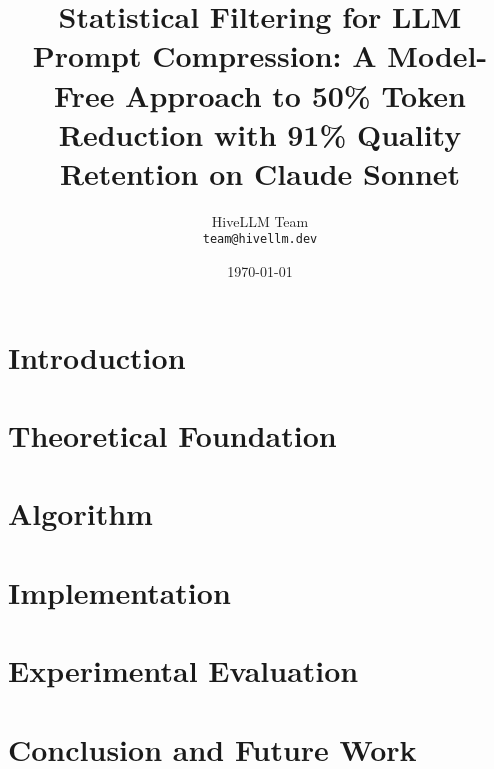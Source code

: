\documentclass{article}
\title{Statistical Filtering for LLM Prompt Compression: A Model-Free Approach to 50\% Token Reduction with 91\% Quality Retention on Claude Sonnet}
\author{
  HiveLLM Team \\
  \texttt{team@hivellm.dev}
}
\date{\today}
\begin{document}
\maketitle

\begin{abstract}

\end{abstract}

\section{Introduction}


\section{Theoretical Foundation}


\section{Algorithm}


\section{Implementation}


\section{Experimental Evaluation}


\section{Conclusion and Future Work}




\end{document}
